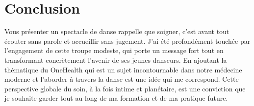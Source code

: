 \section{Conclusion}

Vous présenter un spectacle de danse rappelle que soigner, c’est avant tout écouter sans parole et accueillir sans jugement. J’ai été profondément touchée par l'engagement de cette troupe modeste, qui porte un message fort tout en transformant concrètement l'avenir de ses jeunes danseurs. En ajoutant la thématique du OneHealth qui est un sujet incontournable dans notre médecine moderne et l’aborder à travers la danse est une idée qui me correspond. Cette perspective globale du soin, à la fois intime et planétaire, est une conviction que je souhaite garder tout au long de ma formation et de ma pratique future.
